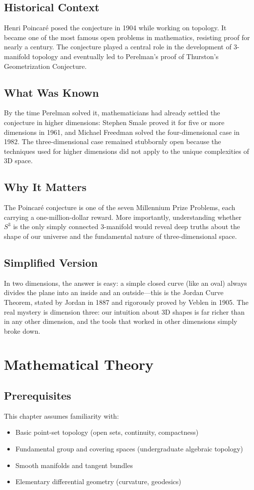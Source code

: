 \subsection{Historical Context}
Henri Poincaré posed the conjecture in 1904 while working on topology. It became one of the most famous open problems in mathematics, resisting proof for nearly a century. The conjecture played a central role in the development of 3-manifold topology and eventually led to Perelman's proof of Thurston's Geometrization Conjecture.

\subsection{What Was Known}
By the time Perelman solved it, mathematicians had already settled the conjecture in higher dimensions: Stephen Smale proved it for five or more dimensions in 1961, and Michael Freedman solved the four-dimensional case in 1982. The three-dimensional case remained stubbornly open because the techniques used for higher dimensions did not apply to the unique complexities of 3D space.

\subsection{Why It Matters}
The Poincar\'e conjecture is one of the seven Millennium Prize Problems, each carrying a one-million-dollar reward. More importantly, understanding whether $S^3$ is the only simply connected 3-manifold would reveal deep truths about the shape of our universe and the fundamental nature of three-dimensional space.

\subsection{Simplified Version}
In two dimensions, the answer is easy: a simple closed curve (like an oval) always divides the plane into an inside and an outside---this is the Jordan Curve Theorem, stated by Jordan in 1887 and rigorously proved by Veblen in 1905. The real mystery is dimension three: our intuition about 3D shapes is far richer than in any other dimension, and the tools that worked in other dimensions simply broke down.

\section{Mathematical Theory}


\subsection{Prerequisites}
This chapter assumes familiarity with:
\begin{itemize}
\item Basic point-set topology (open sets, continuity, compactness)
\item Fundamental group and covering spaces (undergraduate algebraic topology)
\item Smooth manifolds and tangent bundles
\item Elementary differential geometry (curvature, geodesics)
\end{itemize}

